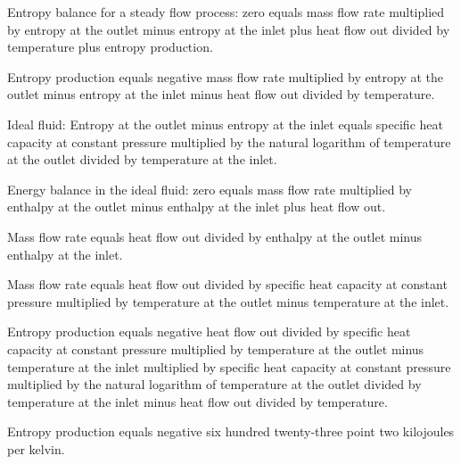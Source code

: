 Entropy balance for a steady flow process:  
zero equals mass flow rate multiplied by entropy at the outlet minus entropy at the inlet plus heat flow out divided by temperature plus entropy production.  

Entropy production equals negative mass flow rate multiplied by entropy at the outlet minus entropy at the inlet minus heat flow out divided by temperature.  

Ideal fluid:  
Entropy at the outlet minus entropy at the inlet equals specific heat capacity at constant pressure multiplied by the natural logarithm of temperature at the outlet divided by temperature at the inlet.  

Energy balance in the ideal fluid:  
zero equals mass flow rate multiplied by enthalpy at the outlet minus enthalpy at the inlet plus heat flow out.  

Mass flow rate equals heat flow out divided by enthalpy at the outlet minus enthalpy at the inlet.  

Mass flow rate equals heat flow out divided by specific heat capacity at constant pressure multiplied by temperature at the outlet minus temperature at the inlet.  

Entropy production equals negative heat flow out divided by specific heat capacity at constant pressure multiplied by temperature at the outlet minus temperature at the inlet multiplied by specific heat capacity at constant pressure multiplied by the natural logarithm of temperature at the outlet divided by temperature at the inlet minus heat flow out divided by temperature.  

Entropy production equals negative six hundred twenty-three point two kilojoules per kelvin.